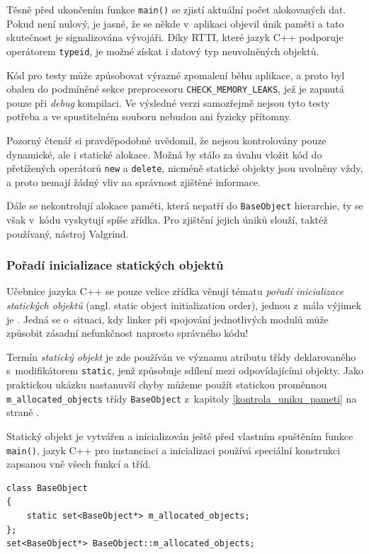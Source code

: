 \documentclass[11pt,twoside,a4paper]{book}
\begin{document}
Těsně před ukončením funkce \texttt{main()} se zjistí aktuální počet alokovaných dat. Pokud není nulový, je jasné, že se někde v~aplikaci objevil únik paměti a tato skutečnost je signalizována vývojáři. Díky RTTI, které jazyk C++ podporuje operátorem \texttt{typeid}, je možné získat i datový typ neuvolněných objektů.

Kód pro testy může způsobovat výrazné zpomalení běhu aplikace, a proto byl obalen do podmíněné sekce preprocesoru \texttt{CHECK\_MEMORY\_LEAKS}, jež je zapnutá pouze při \textit{debug} kompilaci. Ve výsledné verzi samozřejmě nejsou tyto testy potřeba a ve spustitelném souboru nebudou ani fyzicky přítomny.

Pozorný čtenář si pravděpodobně uvědomil, že nejsou kontrolovány pouze dynamické, ale i statické alokace. Možná by stálo za úvahu vložit kód do přetížených operátorů \texttt{new} a \texttt{delete}, nicméně statické objekty jsou uvolněny vždy, a proto nemají žádný vliv na správnost zjištěné informace.

Dále se nekontrolují alokace paměti, která nepatří do \texttt{BaseObject} hierarchie, ty se však v~kódu vyskytují spíše zřídka. Pro zjištění jejich úniků slouží, taktéž používaný, nástroj Valgrind.


\subsubsection{Pořadí inicializace statických objektů}

Učebnice jazyka C++ se pouze velice zřídka věnují tématu \textit{pořadí inicializace statických objektů} (angl. static object initialization order), jednou z~mála výjimek je \cite{industrial_strength_cpp}. Jedná se o~situaci, kdy linker při spojování jednotlivých modulů může způsobit zásadní nefunkčnost naprosto správného kódu!

Termín \textit{statický objekt} je zde používán ve významu atributu třídy deklarovaného s~modifikátorem \texttt{static}, jenž způsobuje sdílení mezi odpovídajícími objekty. Jako praktickou ukázku nastanuvší chyby můžeme použít statickou proměnnou \texttt{m\_allocated\_objects} třídy \texttt{BaseObject} z~kapitoly \ref{kontrola_uniku_pameti} na straně \pageref{kontrola_uniku_pameti}.

Statický objekt je vytvářen a inicializován ještě před vlastním spuštěním funkce \texttt{main()}, jazyk C++ pro instanciaci a inicializaci používá speciální konstrukci zapsanou vně všech funkcí a tříd.

\begin{verbatim}
class BaseObject
{
    static set<BaseObject*> m_allocated_objects;
};
set<BaseObject*> BaseObject::m_allocated_objects;
\end{verbatim}
\end{document}
